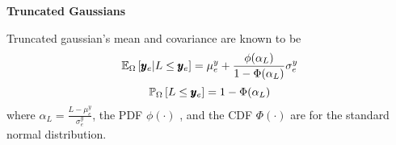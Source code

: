 \textbf{Truncated Gaussians}

Truncated gaussian's mean and covariance are known to be
\[  \mathbb{E}_{\Omega} \left[  \pmb{y}_e | L \leq \pmb{y}_e  \right] = \mu^y_e + \frac{\phi( \alpha_L )}{ 1- \Phi(\alpha_L)} \sigma^y_e \]
\[ \mathbb{P}_{\Omega} \left[  L \leq \pmb{y}_e  \right] = 1 - \Phi(\alpha_L) \]
where $\alpha_L = \frac{L - \mu^y_e}{\sigma^y_e}$, the PDF $\phi(\cdot)$ , and the CDF $\Phi(\cdot)$ are for the standard normal distribution.  
